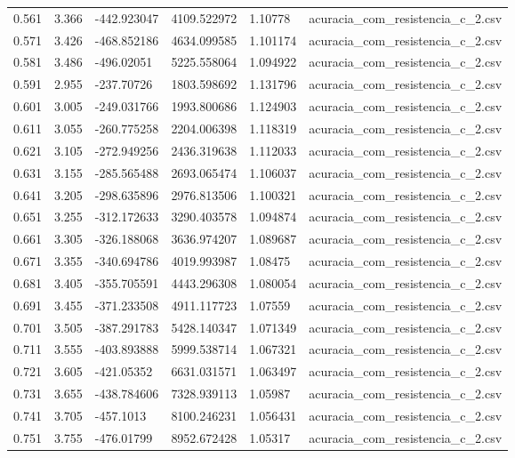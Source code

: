\begin{table}
\begin{tabular}{llllll}
0.561 & 3.366 & -442.923047 & 4109.522972 & 1.10778 & acuracia\_com\_resistencia\_c\_2.csv \\
0.571 & 3.426 & -468.852186 & 4634.099585 & 1.101174 & acuracia\_com\_resistencia\_c\_2.csv \\
0.581 & 3.486 & -496.02051 & 5225.558064 & 1.094922 & acuracia\_com\_resistencia\_c\_2.csv \\
0.591 & 2.955 & -237.70726 & 1803.598692 & 1.131796 & acuracia\_com\_resistencia\_c\_2.csv \\
0.601 & 3.005 & -249.031766 & 1993.800686 & 1.124903 & acuracia\_com\_resistencia\_c\_2.csv \\
0.611 & 3.055 & -260.775258 & 2204.006398 & 1.118319 & acuracia\_com\_resistencia\_c\_2.csv \\
0.621 & 3.105 & -272.949256 & 2436.319638 & 1.112033 & acuracia\_com\_resistencia\_c\_2.csv \\
0.631 & 3.155 & -285.565488 & 2693.065474 & 1.106037 & acuracia\_com\_resistencia\_c\_2.csv \\
0.641 & 3.205 & -298.635896 & 2976.813506 & 1.100321 & acuracia\_com\_resistencia\_c\_2.csv \\
0.651 & 3.255 & -312.172633 & 3290.403578 & 1.094874 & acuracia\_com\_resistencia\_c\_2.csv \\
0.661 & 3.305 & -326.188068 & 3636.974207 & 1.089687 & acuracia\_com\_resistencia\_c\_2.csv \\
0.671 & 3.355 & -340.694786 & 4019.993987 & 1.08475 & acuracia\_com\_resistencia\_c\_2.csv \\
0.681 & 3.405 & -355.705591 & 4443.296308 & 1.080054 & acuracia\_com\_resistencia\_c\_2.csv \\
0.691 & 3.455 & -371.233508 & 4911.117723 & 1.07559 & acuracia\_com\_resistencia\_c\_2.csv \\
0.701 & 3.505 & -387.291783 & 5428.140347 & 1.071349 & acuracia\_com\_resistencia\_c\_2.csv \\
0.711 & 3.555 & -403.893888 & 5999.538714 & 1.067321 & acuracia\_com\_resistencia\_c\_2.csv \\
0.721 & 3.605 & -421.05352 & 6631.031571 & 1.063497 & acuracia\_com\_resistencia\_c\_2.csv \\
0.731 & 3.655 & -438.784606 & 7328.939113 & 1.05987 & acuracia\_com\_resistencia\_c\_2.csv \\
0.741 & 3.705 & -457.1013 & 8100.246231 & 1.056431 & acuracia\_com\_resistencia\_c\_2.csv \\
0.751 & 3.755 & -476.01799 & 8952.672428 & 1.05317 & acuracia\_com\_resistencia\_c\_2.csv \\

\end{tabular}
\end{table}
